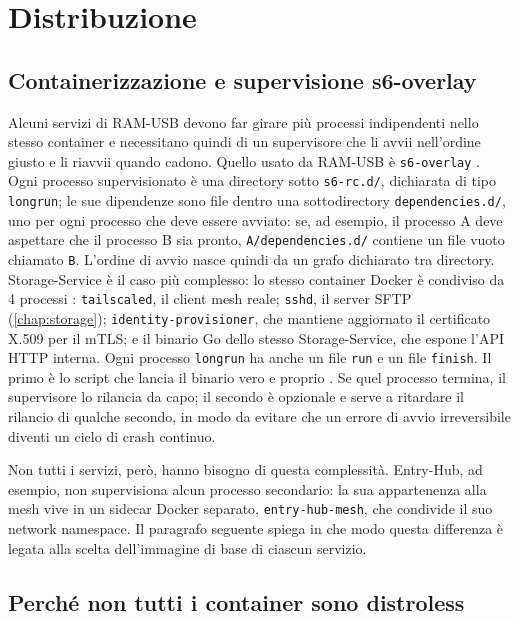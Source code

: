 \chapter{Distribuzione}
\label{chap:deployment}

\section{Containerizzazione e supervisione s6-overlay}
\label{sec:s6-overlay}

Alcuni servizi di RAM-USB devono far girare più processi indipendenti nello stesso container e 
necessitano quindi di un supervisore che li avvii nell'ordine giusto e li riavvii quando cadono.
Quello usato da RAM-USB è \texttt{s6-overlay} \cite{s6-overlay-github}. 
Ogni processo supervisionato è una directory sotto \texttt{s6-rc.d/}, dichiarata di tipo \texttt{longrun}; 
le sue dipendenze sono file dentro una sottodirectory \texttt{dependencies.d/}, uno per ogni processo che 
deve essere avviato: se, ad esempio, il processo A deve aspettare che il processo B sia pronto, 
\texttt{A/dependencies.d/} contiene un file vuoto chiamato \texttt{B}. 
L'ordine di avvio nasce quindi da un grafo dichiarato tra directory.
Storage-Service è il caso più complesso: lo stesso container Docker è condiviso da 4 processi
\cite{ramusb-code-storage-s6-tree}: \texttt{tailscaled}, il client mesh reale; \texttt{sshd}, il server
SFTP (\autoref{chap:storage}); \texttt{identity-provisioner}, che mantiene aggiornato il certificato X.509 
per il mTLS; e il binario Go dello stesso Storage-Service, che espone l'API HTTP interna. 
Ogni processo \texttt{longrun} ha anche un file \texttt{run} e un file \texttt{finish}. Il primo è lo 
script che lancia il binario vero e proprio \cite{ramusb-code-storage-s6-tree}. 
Se quel processo termina, il supervisore lo rilancia da capo;
il secondo è opzionale e serve a ritardare il rilancio di qualche secondo, in modo da evitare che un errore
di avvio irreversibile diventi un ciclo di crash continuo.

Non tutti i servizi, però, hanno bisogno di questa complessità. Entry-Hub, ad esempio, non supervisiona 
alcun processo secondario: la sua appartenenza alla mesh vive in un sidecar Docker separato, 
\texttt{entry-hub-mesh}, che condivide il suo network namespace. Il paragrafo seguente spiega in che modo 
questa differenza è legata alla scelta dell'immagine di base di ciascun servizio.

\section{Perché non tutti i container sono distroless}
\label{sec:distroless}

